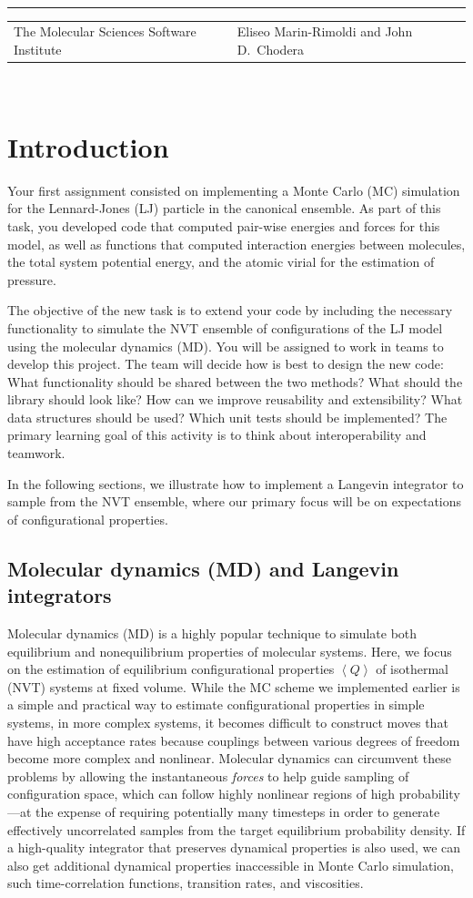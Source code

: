 \documentclass[aip,jcp,preprint,superscriptaddress,floatfix]{revtex4-1}
\renewcommand{\title}[1]{\textbf{\large{#1}}\\}
\newcommand{\leftright}[2]{\begin{tabularx}{\textwidth}{X>{\raggedleft}X}#1%
& #2\\\end{tabularx}\\[-1cm]}
\begin{document}
\title{ }
\rule{\textwidth}{1pt}
\leftright{The Molecular Sciences Software Institute}{Eliseo Marin-Rimoldi and John D.~Chodera} %

\bigskip

\section{Introduction}

Your first assignment consisted on implementing a Monte Carlo (MC) simulation
for the Lennard-Jones (LJ) particle in the canonical ensemble. 
As part of this task, you developed code that computed pair-wise energies and forces for this model, 
as well as functions that computed interaction energies between molecules,
the total system potential energy, and the atomic virial for the estimation of pressure.

The objective of the new task is to extend your code by including the
necessary functionality to simulate the NVT ensemble of configurations 
of the LJ model using the molecular dynamics (MD). You will be 
assigned to work in teams to develop this project. The team will
decide how is best to design the new code: What functionality should be shared
between the two methods? What should the library should look like? How can
we improve reusability and extensibility? What data
structures should be used? Which unit tests should be implemented?
The primary learning goal of this activity is to think about interoperability and teamwork.

In the following sections, we illustrate how to implement a Langevin integrator to sample from the NVT ensemble, where our primary focus will be on expectations of configurational properties.

\subsection{Molecular dynamics (MD) and Langevin integrators}

Molecular dynamics (MD) is a highly popular technique to simulate both equilibrium and nonequilibrium properties of molecular systems.
Here, we focus on the estimation of equilibrium configurational properties $\left< Q \right>$ of isothermal (NVT) systems at fixed volume.
While the MC scheme we implemented earlier is a simple and practical way to estimate configurational properties in simple systems, in more complex systems, it becomes difficult to construct moves that have high acceptance rates because couplings between various degrees of freedom become more complex and nonlinear.
Molecular dynamics can circumvent these problems by allowing the instantaneous \emph{forces} to help guide sampling of configuration space, which can follow highly nonlinear regions of high probability---at the expense of requiring potentially many timesteps in order to generate effectively uncorrelated samples from the target equilibrium probability density.
If a high-quality integrator that preserves dynamical properties is also used, we can also get additional dynamical properties inaccessible in Monte Carlo simulation, such time-correlation functions, transition rates, and viscosities. 
\end{document}
